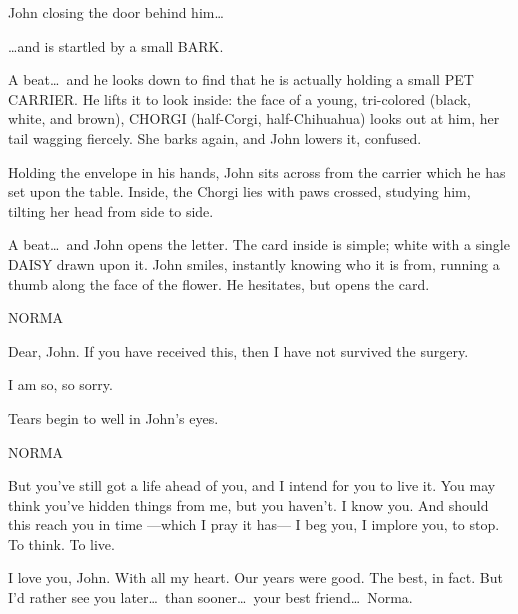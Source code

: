 \documentclass[letterpaper,literary]{screenwriter}
\begin{document}

John closing the door behind him\dots

\dots and is startled by a small BARK.

A beat\dots\ and he looks down to find that he is actually holding a
small PET CARRIER.  He lifts it to look inside: the face of a young,
tri-colored (black, white, and brown), CHORGI (half-Corgi,
half-Chihuahua) looks out at him, her tail wagging fiercely.  She barks
again, and John lowers it, confused.


    Holding the envelope in his hands, John sits across from the carrier
    which he has set upon the table.  Inside, the Chorgi lies with paws
    crossed, studying him, tilting her head from side to side.

    A beat\dots\ and John opens the letter.  The card inside is simple;
    white with a single DAISY drawn upon it.  John smiles, instantly
    knowing who it is from, running a thumb along the face of the
    flower.  He hesitates, but opens the card.

\begin{dialogue}{NORMA \voiceover}

    Dear, John.  If you have received this, then I have not survived the
    surgery.


    I am so, so sorry.

\end{dialogue}

Tears begin to well in John's eyes.

\begin{dialogue}{NORMA \voiceover}

    But you've still got a life ahead of you, and I intend for you to
    live it.  You may think you've hidden things from me, but you
    haven't.  I know you.  And should this reach you in time ---which
    I pray it has--- I beg you, I implore you, to stop.  To think.  To
    live.


    I love you, John.  With all my heart.  Our years were good.  The
    best, in fact.  But I'd rather see you later\dots\ than sooner\dots\
    your best friend\dots\ Norma.

\end{dialogue}
\end{document}
